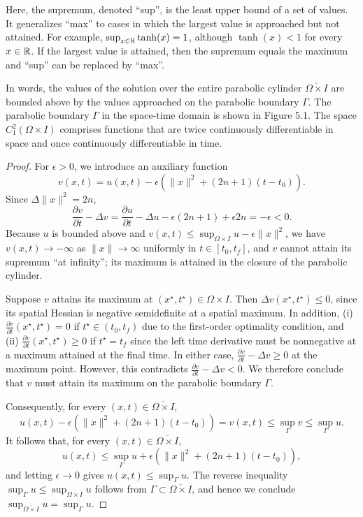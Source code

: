 Here, the supremum, denoted ``sup'', is the least upper bound of a set of values. It generalizes ``max'' to cases in which the largest value is approached but not attained. For example, $\sup_{x \in \mathbb{R}} \tanh(x) = 1$, although $\tanh(x) < 1$ for every $x \in \mathbb{R}$. If the largest value is attained, then the supremum equals the maximum and ``sup'' can be replaced by ``max''.

In words, the values of the solution over the entire parabolic cylinder $\overline{\Omega \times I}$ are bounded above by the values approached on the parabolic boundary $\Gamma$. The parabolic boundary $\Gamma$ in the space-time domain is shown in Figure 5.1. The space $C_1^2(\Omega \times I)$ comprises functions that are twice continuously differentiable in space and once continuously differentiable in time.


\begin{proof}
    For $\epsilon > 0$, we introduce an auxiliary function
    \[v(x, t) = u(x, t) - \epsilon(\|x\|^2 + (2n + 1)(t - t_0)).\]
    Since $\Delta \|x\|^2 = 2n$,
    \[\frac{\partial v}{\partial t} - \Delta v = \frac{\partial u}{\partial t} - \Delta u - \epsilon(2n + 1) + \epsilon 2n = -\epsilon < 0.\]
    Because $u$ is bounded above and $v(x, t) \leq \sup_{\overline{\Omega \times I}} u - \epsilon \|x\|^2$, we have $v(x, t) \to -\infty$ as $\|x\| \to \infty$ uniformly in $t \in [t_0, t_f]$, and $v$ cannot attain its supremum ``at infinity''; its maximum is attained in the closure of the parabolic cylinder.

    Suppose $v$ attains its maximum at $(x^\star, t^\star) \in \Omega \times I$. Then $\Delta v(x^\star, t^\star) \leq 0$, since its spatial Hessian is negative semidefinite at a spatial maximum. In addition, (i) $\frac{\partial v}{\partial t}(x^\star, t^\star) = 0$ if $t^\star \in (t_0, t_f)$ due to the first-order optimality condition, and (ii) $\frac{\partial v}{\partial t}(x^\star, t^\star) \geq 0$ if $t^\star = t_f$ since the left time derivative must be nonnegative at a maximum attained at the final time. In either case, $\frac{\partial v}{\partial t} - \Delta v \geq 0$ at the maximum point. However, this contradicts $\frac{\partial v}{\partial t} - \Delta v < 0$. We therefore conclude that $v$ must attain its maximum on the parabolic boundary $\Gamma$.

    Consequently, for every $(x, t) \in \overline{\Omega \times I}$,
    \[u(x, t) - \epsilon(\|x\|^2 + (2n + 1)(t - t_0)) = v(x, t) \leq \sup_\Gamma v \leq \sup_\Gamma u.\]
    It follows that, for every $(x, t) \in \overline{\Omega \times I}$,
    \[u(x, t) \leq \sup_\Gamma u + \epsilon(\|x\|^2 + (2n + 1)(t - t_0)),\]
    and letting $\epsilon \to 0$ gives $u(x, t) \leq \sup_\Gamma u$. The reverse inequality $\sup_\Gamma u \leq \sup_{\overline{\Omega \times I}} u$ follows from $\Gamma \subset \overline{\Omega \times I}$, and hence we conclude $\sup_{\overline{\Omega \times I}} u = \sup_\Gamma u$.
\end{proof}

